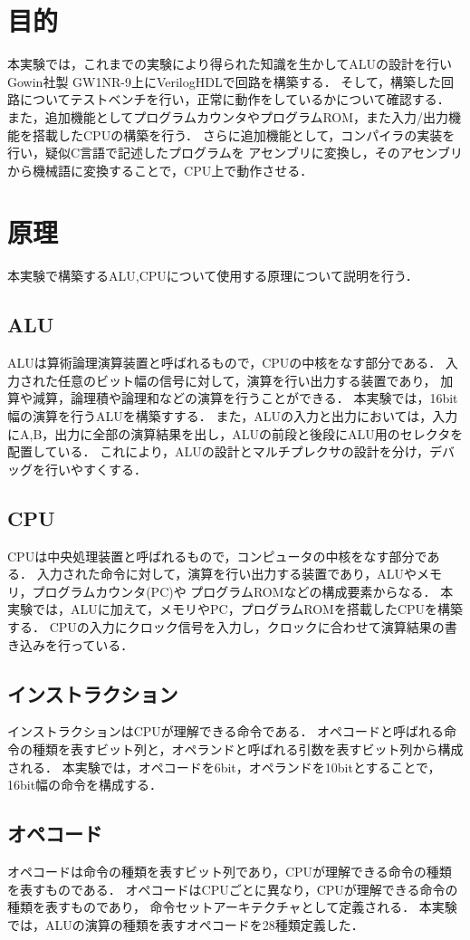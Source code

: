 \documentclass[a4paper,11pt]{ltjsarticle}
\begin{document}
\section{目的}
本実験では，これまでの実験により得られた知識を生かしてALUの設計を行い
Gowin社製 GW1NR-9上にVerilogHDLで回路を構築する．
そして，構築した回路についてテストベンチを行い，正常に動作をしているかについて確認する．
また，追加機能としてプログラムカウンタやプログラムROM，また入力/出力機能を搭載したCPUの構築を行う．
さらに追加機能として，コンパイラの実装を行い，疑似C言語で記述したプログラムを
アセンブリに変換し，そのアセンブリから機械語に変換することで，CPU上で動作させる．
\section{原理}
本実験で構築するALU,CPUについて使用する原理について説明を行う．
\subsection{ALU}
ALUは算術論理演算装置と呼ばれるもので，CPUの中核をなす部分である．
入力された任意のビット幅の信号に対して，演算を行い出力する装置であり，
加算や減算，論理積や論理和などの演算を行うことができる．
本実験では，16bit幅の演算を行うALUを構築すする．
また，ALUの入力と出力においては，入力にA,B，出力に全部の演算結果を出し，ALUの前段と後段にALU用のセレクタを配置している．
これにより，ALUの設計とマルチプレクサの設計を分け，デバッグを行いやすくする．
\subsection{CPU}
CPUは中央処理装置と呼ばれるもので，コンピュータの中核をなす部分である．
入力された命令に対して，演算を行い出力する装置であり，ALUやメモリ，プログラムカウンタ(PC)や
プログラムROMなどの構成要素からなる．
本実験では，ALUに加えて，メモリやPC，プログラムROMを搭載したCPUを構築する．
CPUの入力にクロック信号を入力し，クロックに合わせて演算結果の書き込みを行っている．
\subsection{インストラクション}
インストラクションはCPUが理解できる命令である．
オペコードと呼ばれる命令の種類を表すビット列と，オペランドと呼ばれる引数を表すビット列から構成される．
本実験では，オペコードを6bit，オペランドを10bitとすることで，16bit幅の命令を構成する．
\subsection{オペコード}
オペコードは命令の種類を表すビット列であり，CPUが理解できる命令の種類を表すものである．
オペコードはCPUごとに異なり，CPUが理解できる命令の種類を表すものであり，
命令セットアーキテクチャとして定義される．
本実験では，ALUの演算の種類を表すオペコードを28種類定義した．
\end{document}
